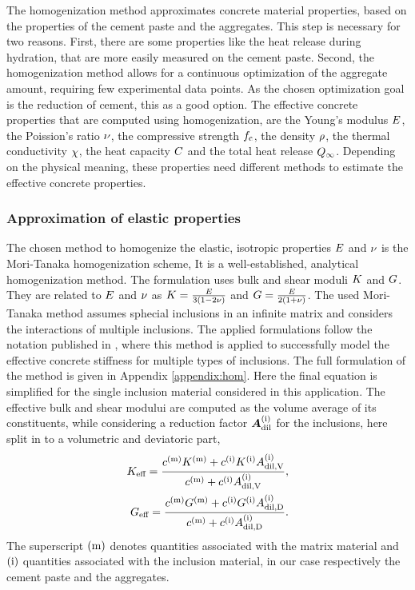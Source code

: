 

The homogenization method approximates concrete material properties, based on the properties of the cement paste and the aggregates.
This step is necessary for two reasons.
First, there are some properties like the heat release during hydration, that are more easily measured on the cement paste.
Second, the homogenization method allows for a continuous optimization of the aggregate amount, requiring few experimental data points.
As the chosen optimization goal is the reduction of cement, this as a good option.
The effective concrete properties that are computed using homogenization, are the Young's modulus $E$, the Poission's ratio $\nu$, the compressive strength $f_{\text{c}}$, the density $\rho$, the thermal conductivity $\chi$, the heat capacity $C$ and the total heat release $Q_{\infty}$.
Depending on the physical meaning, these properties need different methods to estimate the effective concrete properties.
\subsubsection{Approximation of elastic properties}
The chosen method to homogenize the elastic, isotropic properties $E$ and $\nu$ is the Mori-Tanaka homogenization scheme, \cite{mor_1973_asi}
It is a well-established, analytical homogenization method.
The formulation uses bulk and shear moduli $K$ and $G$.
They are related to $E$ and $\nu$ as $K = \frac{E}{3(1-2\nu)}$ and $G = \frac{E}{2(1+\nu)}$.
The used Mori-Tanaka method assumes sphecial inclusions in an infinite matrix and considers the interactions of multiple inclusions.
The applied formulations follow the notation published in 
\cite{nee_2012_ammf}, where this method is applied to successfully model the effective concrete stiffness for multiple types of inclusions.
The full formulation of the method is given in Appendix \ref{appendix:hom}.
Here the final equation is simplified for the single inclusion material considered in this application.
The effective bulk and shear modului are computed as the volume average of its constituents,  
while considering a reduction factor $\boldsymbol{A}_{\text{dil}}^{(\text{i})}$ for the inclusions, here split in to a volumetric and deviatoric part,
\begin{align}
	K_{\text{eff}} = \dfrac{c^{(\text{m})}K^{(\text{m})} + c^{(\text{i})} K^{(\text{i})} A^{(\text{i})}_{\text{dil,V}}}{c^{(\text{m})} +  c^{(\text{i})} A^{(\text{i})}_{\text{dil,V}}}, \\
	G_{\text{eff}} = \dfrac{c^{(\text{m})}G^{(\text{m})} +  c^{(\text{i})} G^{(\text{i})} A^{(\text{i})}_{\text{dil,D}}}{c^{(\text{m})} +  c^{(\text{i})} A^{(\text{i})}_{\text{dil,D}}}.
\end{align}
The superscript $(\text{m})$ denotes quantities associated with the matrix material and   $(\text{i})$ quantities associated with the inclusion material, in our case respectively the cement paste and the aggregates.


